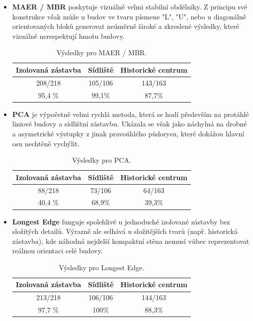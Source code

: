 \begin{itemize}
    \item \textbf{MAER / MBR} poskytuje vizuálně velmi stabilní obdélníky. Z principu své konstrukce však může u budov ve tvaru písmene "L", "U", nebo u diagonálně orientovaných bloků generovat neúměrně široké a zkreslené výsledky, které vizuálně nerespektují hmotu budovy.
    \begin{table}[h!]
\centering
\begin{tabular}{|c|c|c|}
\hline
 Izolovaná zástavba & Sídliště & Historické centrum  \\
 \hline
208/218 & 105/106  &  143/163 \\
\hline
 95,4 \% & 99,1\%  & 87,7\%  \\
 \hline
\end{tabular}
    \caption{Výsledky pro MAER / MBR.}
\label{table:MBR}
\end{table}

    \item \textbf{PCA} je výpočetně velmi rychlá metoda, která se hodí především na protáhlé liniové budovy a sídlištní zástavbu. Ukázala se však jako náchylná na drobné a asymetrické výstupky z jinak pravoúhlého půdorysu, které dokážou hlavní osu nechtěně vychýlit.
        \begin{table}[h!]
\centering
\begin{tabular}{|c|c|c|}
\hline
 Izolovaná zástavba & Sídliště & Historické centrum  \\
 \hline
88/218 & 73/106  &  64/163 \\
\hline
 40,4 \% & 68,9\%  & 39,3\%  \\
 \hline
\end{tabular}
    \caption{Výsledky pro PCA.}
\end{table}

    \item \textbf{Longest Edge} funguje spolehlivě u jednoduché izolované zástavby bez složitých detailů. Výrazně ale selhává u složitějších tvarů (např. historická zástavba), kde náhodná nejdelší kompaktní stěna nemusí vůbec reprezentovat reálnou orientaci celé budovy.
        \begin{table}[h!]
\centering
\begin{tabular}{|c|c|c|}
\hline
 Izolovaná zástavba & Sídliště & Historické centrum  \\
 \hline
213/218 & 106/106  &  144/163 \\
\hline
 97,7 \% & 100\%  & 88,3\%  \\
 \hline
\end{tabular}
    \caption{Výsledky pro Longest Edge.}
\end{table}


\end{itemize}

